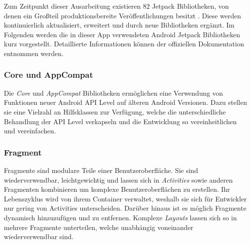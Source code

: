Zum Zeitpunkt dieser Ausarbeitung existieren 82 Jetpack Bibliotheken, von denen ein Großteil produktionsbereite Veröffentlichungen besitzt \autocite{jetpackcount}.
Diese werden kontinuierlich aktualisiert, erweitert und durch neue Bibliotheken ergänzt.
Im Folgenden werden die in dieser App verwendeten Android Jetpack Bibliotheken kurz vorgestellt. Detaillierte Informationen können der offiziellen Dokumentation entnommen werden.

\subsubsection{Core und AppCompat}
\label{subsubsec:app:jetpack:base}
Die \textit{Core} und \textit{AppCompat} Bibliotheken ermöglichen eine Verwendung von Funktionen neuer Android API Level auf älteren Android Versionen.
Dazu stellen sie eine Vielzahl an Hilfsklassen zur Verfügung, welche die unterschiedliche Behandlung der API Level verkapseln und die Entwicklung so vereinheitlichen und vereinfachen.

\subsubsection{Fragment}
\label{subsubsec:app:jetpack:fragment}
Fragmente sind modulare Teile einer Benutzeroberfläche.
Sie sind wiederverwendbar, leichtgewichtig und lassen sich in \textit{Activities} sowie anderen Fragmenten kombinieren um komplexe Benutzeroberflächen zu erstellen.
Ihr Lebenszyklus wird von ihrem Container verwaltet, weshalb sie sich für Entwickler nur gering von Activities unterscheiden.
Darüber hinaus ist es möglich Fragmente dynamisch hinzuzufügen und zu entfernen.
Komplexe \textit{Layouts} lassen sich so in mehrere Fragmente unterteilen, welche unabhängig voneinander wiederverwendbar sind.

